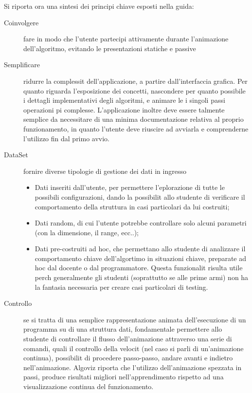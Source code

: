 Si riporta ora una sintesi dei principi chiave esposti nella guida: 
\begin{description}
\item [{{Coinvolgere}}] fare in modo che l'utente partecipi attivamente
durante l'animazione dell'algoritmo, evitando le presentazioni statiche
e passive 
\item [{{Semplificare}}] ridurre la complessit dell'applicazione, a partire
dall'interfaccia grafica. Per quanto riguarda l'esposizione dei concetti,
nascondere per quanto possibile i dettagli implementativi degli algoritmi,
e animare le i singoli passi operazioni pi complesse. L'applicazione
inoltre deve essere talmente semplice da necessitare di una minima
documentazione relativa al proprio funzionamento, in quanto l'utente
deve riuscire ad avviarla e comprenderne l'utilizzo fin dal primo
avvio. 
\item [{{DataSet}}] fornire diverse tipologie di gestione dei dati in
ingresso

\begin{itemize}
\item Dati inseriti dall'utente, per permettere l'eplorazione di tutte le
possibili configurazioni, dando la possibilit allo studente di verificare
il comportamento della struttura in casi particolari da lui costruiti; 
\item Dati random, di cui l'utente potrebbe controllare solo alcuni parametri
(con la dimensione, il range, ecc..); 
\item Dati pre-costruiti ad hoc, che permettano allo studente di analizzare
il comportamento chiave dell'algortimo in situazioni chiave, preparate
ad hoc dal docente o dal programmatore. Questa funzionalit risulta
utile perch generalmente gli studenti (soprattutto se alle prime armi)
non ha la fantasia necessaria per creare casi particolari di testing. 
\end{itemize}
\item [{{Controllo}}] se si tratta di una semplice rappresentazione animata
dell'esecuzione di un programma su di una struttura dati, fondamentale
permettere allo studente di controllare il flusso dell'animazione
attraverso una serie di comandi, quali il controllo della velocit
(nel caso si parli di un'animazione continua), possibilit di procedere
passo-passo, andare avanti e indietro nell'animazione. Algoviz riporta
che l'utilizzo dell'animazione spezzata in passi, produce risultati
migliori nell'apprendimento rispetto ad una visualizzazione continua
del funzionamento. 
\end{description}

